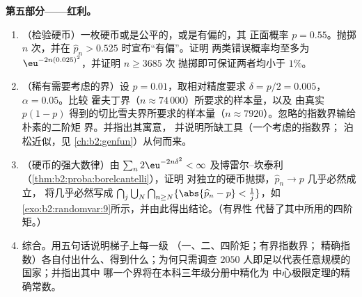 \begin{problem}
\medskip
\noindent\textbf{第五部分——红利。}
\begin{enumerate}[resume]
  \item （检验硬币）一枚硬币或是公平的，或是有偏的，其
        正面概率 $p = 0.55$。抛掷 $n$ 次，并在
        $\widehat p_n > 0.525$ 时宣布“有偏”。证明
        两类错误概率均至多为
        $\eu^{-2n(0.025)^2}$，并证明 $n \geq 3685$ 次
        抛掷即可保证两者均小于 $1\%$。
  \item （稀有需要考虑的界）设 $p =
        0.01$，取相对精度要求 $\delta =
        p/2 = 0.005$，$\alpha = 0.05$。比较
        霍夫丁界（$n \approx 74\,000$）所要求的样本量，以及
        由真实 $p(1-p)$ 得到的切比雪夫界所要求的样本量（$n
        \approx 7920$）。忽略的指数界输给朴素的二阶矩
        界。并指出其寓意，
        并说明所缺工具（一个考虑的指数界；
        泊松近似，见
        \cref{ch:b2:genfun}）从何而来。
  \item （硬币的强大数律）由 $\sum_n
        2\eu^{-2n\delta^2} < \infty$ 及博雷尔–坎泰利
        （\cref{thm:b2:proba:borelcantelli}），证明
        对独立的硬币抛掷，$\widehat p_n \to p$ 几乎必然成立，
        将几乎必然写成
        $\bigcap_j\bigcup_N\bigcap_{n\geq N}
        \{\abs{\widehat p_n - p} < \tfrac1j\}$，如
        \cref{exo:b2:randomvar:9}所示，并由此得出结论。（有界性
        代替了其中所用的四阶矩。）
  \item 综合。用五句话说明梯子上每一级
        （一、二、四阶矩；有界指数界；
        精确指数）各自付出什么、得到什么；为何只需调查 $2050$
        人即足以代表任意规模的国家；并指出其中
        哪一个界将在本科三年级分册中精化为
        中心极限定理的精确常数。
\end{enumerate}
\end{problem}
